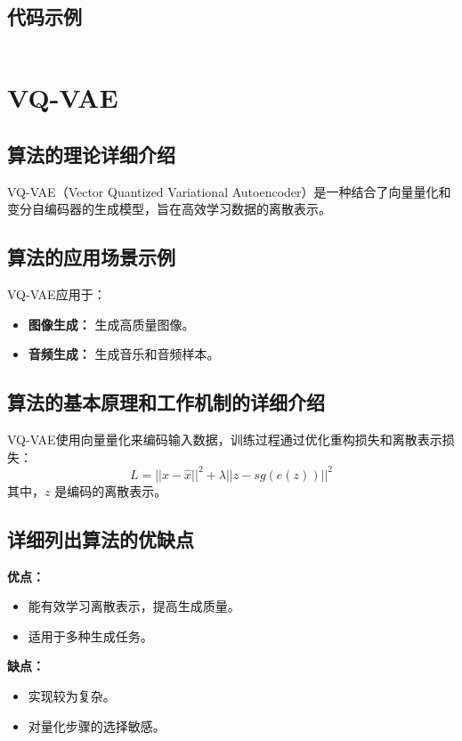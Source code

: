 \subsection*{代码示例}
\begin{lstlisting}

\end{lstlisting}


\section{VQ-VAE}
\subsection*{算法的理论详细介绍}
VQ-VAE（Vector Quantized Variational Autoencoder）是一种结合了向量量化和变分自编码器的生成模型，旨在高效学习数据的离散表示。

\subsection*{算法的应用场景示例}
VQ-VAE应用于：
\begin{itemize}
    \item \textbf{图像生成：} 生成高质量图像。
    \item \textbf{音频生成：} 生成音乐和音频样本。
\end{itemize}

\subsection*{算法的基本原理和工作机制的详细介绍}
VQ-VAE使用向量量化来编码输入数据，训练过程通过优化重构损失和离散表示损失：
\[
    L = || x - \hat{x} ||^2 + \lambda || z - sg(e(z)) ||^2
\]
其中，\(z\) 是编码的离散表示。

\subsection*{详细列出算法的优缺点}
\textbf{优点：}
\begin{itemize}
    \item 能有效学习离散表示，提高生成质量。
    \item 适用于多种生成任务。
\end{itemize}

\textbf{缺点：}
\begin{itemize}
    \item 实现较为复杂。
    \item 对量化步骤的选择敏感。
\end{itemize}

